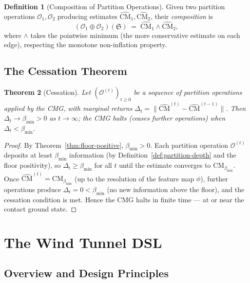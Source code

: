 \documentclass[12pt,a4paper,twocolumn]{article}
\theoremstyle{plain}
\newtheorem{theorem}{Theorem}[section]
\theoremstyle{definition}
\newtheorem{definition}[theorem]{Definition}
\theoremstyle{remark}
\newcommand{\CM}{\mathrm{CM}}
\newcommand{\bmin}{\beta_{\min}}
\newcommand{\CMbmin}{\CM_{\bmin}}
\begin{document}
\begin{definition}[Composition of Partition Operations]
\label{def:composition}
Given two partition operations $\mathcal{O}_1, \mathcal{O}_2$ producing
estimates $\hat{\CM}_1, \hat{\CM}_2$, their \emph{composition} is
\begin{equation}
  (\mathcal{O}_1 \oplus \mathcal{O}_2)(\mathfrak{S}) \;=\;
    \hat{\CM}_1 \wedge \hat{\CM}_2,
\end{equation}
where $\wedge$ takes the pointwise minimum (the more conservative estimate
on each edge), respecting the monotone non-inflation property.
\end{definition}

\subsection{The Cessation Theorem}

\begin{theorem}[Cessation]
\label{thm:cessation}
Let $(\mathcal{O}^{(t)})_{t \geq 0}$ be a sequence of partition operations
applied by the CMG, with marginal returns $\Delta_t = \|\hat{\CM}^{(t)} -
\hat{\CM}^{(t-1)}\|$.  Then $\Delta_t \to \bmin > 0$ as $t \to \infty$;
the CMG halts (ceases further operations) when $\Delta_t < \bmin$.
\end{theorem}

\begin{proof}
By Theorem~\ref{thm:floor-positive}, $\bmin > 0$.  Each partition operation
$\mathcal{O}^{(t)}$ deposits at least $\bmin$ information (by
Definition~\ref{def:partition-depth} and the floor positivity), so $\Delta_t
\geq \bmin$ for all $t$ until the estimate converges to $\CMbmin$.  Once
$\hat{\CM}^{(t)} = \CMbmin$ (up to the resolution of the feature map $\phi$),
further operations produce $\Delta_t = 0 < \bmin$ (no new information above
the floor), and the cessation condition is met.  Hence the CMG halts in finite
time --- at or near the contact ground state.
\end{proof}

\section{The Wind Tunnel DSL}
\label{sec:dsl}

\subsection{Overview and Design Principles}
\end{document}
